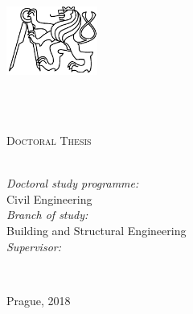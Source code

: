 \documentclass[
    11pt, %
    english, %
    singlespacing, %
    headsepline, %
    ]{MastersDoctoralThesis} %
\begin{document}
\frontmatter %

\pagestyle{plain} %



\begin{titlepage}
\begin{center}

\includegraphics[width=30mm]{figures/logo-cvut} \\
{\scshape\LARGE \univname\par} %
\HRule \\[0.2cm] %
\facname\\[0.2cm] %
\deptname %
\vspace{3.5cm}

{\huge \bfseries \ttitle\par}\vspace{1.0cm} %

\textsc{\Large Doctoral Thesis}\\[1.5cm] %
 
{\large \authorname}\\[3.0cm] %


\begin{minipage}[t]{\textwidth}
\begin{flushleft}
\emph{Doctoral study programme:} \\
Civil Engineering \\[0.5cm] %
\emph{Branch of study:} \\
Building and Structural Engineering \\[0.5cm] %

\emph{Supervisor:} \\
\supname %
\end{flushleft}
\end{minipage}\\[3cm]

\vfill

{\large Prague, 2018}\\[2cm] %
 
\vfill
\end{center}
\end{titlepage}
\end{document}
